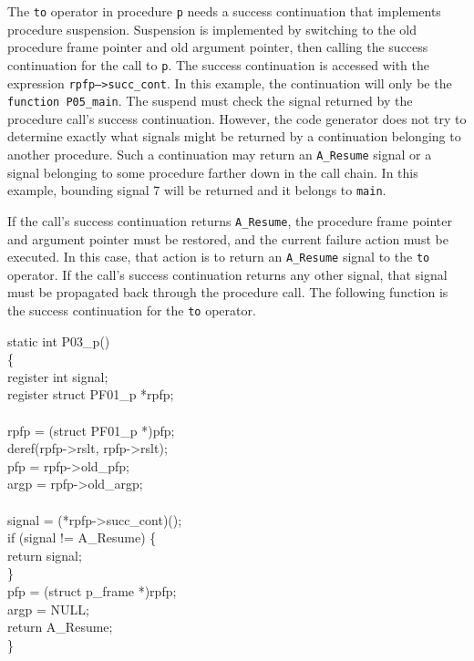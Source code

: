 \noindent
The \texttt{to} operator in procedure \texttt{p} needs a success
continuation that implements procedure suspension. Suspension is
implemented by switching to the old procedure frame pointer and old
argument pointer, then calling the success continuation for the call
to \texttt{p}. The success continuation is accessed with the
expression \texttt{rpfp--{\textgreater}succ\_cont}.  In this example,
the continuation will only be the \texttt{function P05\_main}. The
suspend must check the signal returned by the procedure call's success
continuation. However, the code generator does not try to determine
exactly what signals might be returned by a continuation belonging to
another procedure. Such a continuation may return an
\texttt{A\_Resume} signal or a signal belonging to some procedure
farther down in the call chain. In this example, bounding signal 7
will be returned and it belongs to \texttt{main}.

If the call's success continuation returns \texttt{A\_Resume}, the procedure
frame pointer and argument pointer must be restored, and the current
failure action must be executed. In this case, that action is to
return an \texttt{A\_Resume} signal to the \texttt{to} operator. If the call's success
continuation returns any other signal, that signal must be propagated
back through the procedure call. The following function is the success
continuation for the \texttt{to} operator.

\goodbreak
\begin{iconcode}
static int P03\_p()\\
\{\\
\>register int signal;\\
\>register struct PF01\_p *rpfp;\\
\\
\>rpfp = (struct PF01\_p *)pfp;\\
\>deref(rpfp->rslt, rpfp->rslt);\\
\>pfp = rpfp->old\_pfp;\\
\>argp = rpfp->old\_argp;\\
\\
\>signal = (*rpfp->succ\_cont)();\\
\>if (signal != A\_Resume) \{\\
\>\>return signal;\\
\>\>\}\\
\>pfp = (struct p\_frame *)rpfp;\\
\>argp = NULL;\\
\>return A\_Resume;\\
\}\\
\end{iconcode}



